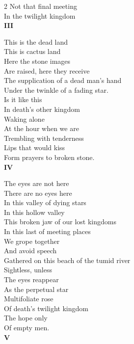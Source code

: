 \documentclass[10pt,a4paper]{article}
\begin{document}
\begin{multicols}{2}
Not that final meeting\\
In the twilight kingdom\\

\hspace{1cm}\textbf{III}

This is the dead land\\
This is cactus land\\
Here the stone images\\
Are raised, here they receive\\
The supplication of a dead man’s hand\\
Under the twinkle of a fading star.\\

Is it like this\\
In death’s other kingdom\\
Waking alone\\
At the hour when we are\\
Trembling with tenderness\\
Lips that would kiss\\
Form prayers to broken stone.\\

\hspace{1cm}\textbf{IV}

The eyes are not here\\
There are no eyes here\\
In this valley of dying stars\\
In this hollow valley\\
This broken jaw of our lost kingdoms\\

In this last of meeting places\\
We grope together\\
And avoid speech\\
Gathered on this beach of the tumid river\\

Sightless, unless\\
The eyes reappear\\
As the perpetual star\\
Multifoliate rose\\
Of death’s twilight kingdom\\
The hope only\\
Of empty men.\\

\hspace{1cm}\textbf{V}


\end{multicols}
\end{document}
